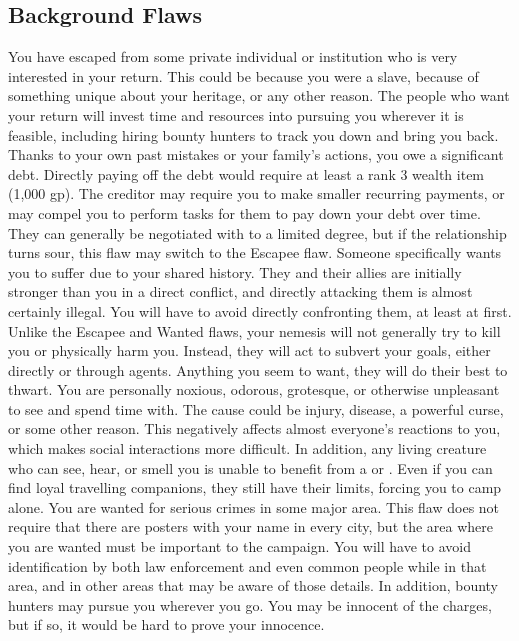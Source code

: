   \subsection{Background Flaws}
     You have escaped from some private individual or institution who is very interested in your return.
    This could be because you were a slave, because of something unique about your heritage, or any other reason.
    The people who want your return will invest time and resources into pursuing you wherever it is feasible, including hiring bounty hunters to track you down and bring you back.
     Thanks to your own past mistakes or your family's actions, you owe a significant debt.
    Directly paying off the debt would require at least a rank 3 wealth item (1,000 gp).
    The creditor may require you to make smaller recurring payments, or may compel you to perform tasks for them to pay down your debt over time.
    They can generally be negotiated with to a limited degree, but if the relationship turns sour, this flaw may switch to the Escapee flaw.
     Someone specifically wants you to suffer due to your shared history.
    They and their allies are initially stronger than you in a direct conflict, and directly attacking them is almost certainly illegal.
    You will have to avoid directly confronting them, at least at first.
    Unlike the Escapee and Wanted flaws, your nemesis will not generally try to kill you or physically harm you.
    Instead, they will act to subvert your goals, either directly or through agents.
    Anything you seem to want, they will do their best to thwart.
     You are personally noxious, odorous, grotesque, or otherwise unpleasant to see and spend time with.
    The cause could be injury, disease, a powerful curse, or some other reason.
    This negatively affects almost everyone's reactions to you, which makes social interactions more difficult.
    In addition, any living creature who can see, hear, or smell you is unable to benefit from a  or .
    Even if you can find loyal travelling companions, they still have their limits, forcing you to camp alone.
     You are wanted for serious crimes in some major area.
    This flaw does not require that there are posters with your name in every city, but the area where you are wanted must be important to the campaign.
    You will have to avoid identification by both law enforcement and even common people while in that area, and in other areas that may be aware of those details.
    In addition, bounty hunters may pursue you wherever you go.
    You may be innocent of the charges, but if so, it would be hard to prove your innocence.

